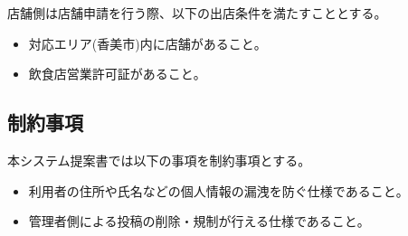 店舗側は店舗申請を行う際、以下の出店条件を満たすこととする。

\begin{itemize}
  \item 対応エリア(香美市)内に店舗があること。
  \item 飲食店営業許可証があること。
\end{itemize}

\subsection{制約事項}
本システム提案書では以下の事項を制約事項とする。
\begin{itemize}
    \item 利用者の住所や氏名などの個人情報の漏洩を防ぐ仕様であること。
    \item 管理者側による投稿の削除・規制が行える仕様であること。
\end{itemize}
